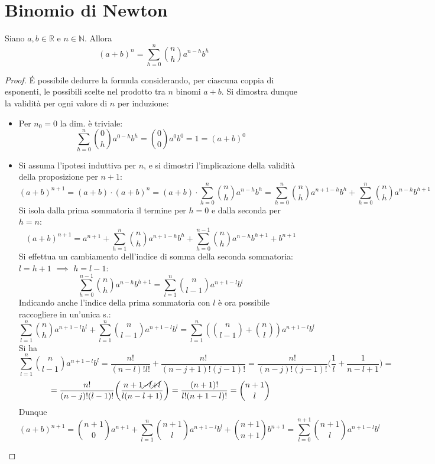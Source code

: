\documentclass[10pt, oneside]{book}
\theoremstyle{plain}
\begin{document}
\section{Binomio di Newton}
\begin{prop}
    Siano $a, b \in \mathbb{R}$ e $n \in \mathbb{N}$. Allora 
    \[(a+b)^n = \sum \limits_{h = 0}^n \binom{n}{h} a^{n - h} b^h\]
\end{prop}
\begin{proof}
    \'E possibile dedurre la formula considerando, per ciascuna coppia di esponenti, le possibili scelte nel prodotto tra $n$ binomi $a+b$. Si dimostra dunque la validità per ogni valore di $n$ per induzione:
    \begin{itemize}
        \item Per $n_0 = 0$ la dim. è triviale: 
        \[\sum \limits_{h = 0}^n \binom{0}{h} a^{0 - h} b^h = \binom{0}{0} a^0 b^0 = 1 = (a+b)^0\]
        \item Si assuma l'ipotesi induttiva per $n$, e si dimostri l'implicazione della validità della proposizione per $n+1$:
        \[(a+b)^{n+1} = (a+b) \cdot (a+b)^n = (a+b) \cdot \sum \limits_{h = 0}^n \binom{n}{h} a^{n - h} b^h = \sum \limits_{h = 0}^n \binom{n}{h} a^{n + 1 - h} b^h + \sum \limits_{h = 0}^n \binom{n}{h} a^{n - h} b^{h + 1}\]
        Si isola dalla prima sommatoria il termine per $h = 0$ e dalla seconda per $h = n$:
        \[(a+b)^{n+1} = a^{n+1} + \sum \limits_{h = 1}^n \binom{n}{h} a^{n + 1 - h} b^h + \sum \limits_{h = 0}^{n-1} \binom{n}{h} a^{n - h} b^{h +1} + b^{n+1}\]
        Si effettua un cambiamento dell'indice di somma della seconda sommatoria: $l = h+1$ $\implies$ $h = l-1$:
        \[\sum \limits_{h = 0}^{n-1} \binom{n}{h} a^{n - h} b^{h +1} = \sum \limits_{l = 1}^{n} \binom{n}{l -1} a^{n + 1 - l} b^{l}\]
        Indicando anche l'indice della prima sommatoria con $l$ è ora possibile raccogliere in un'unica s.:
        \[\sum \limits_{l = 1}^n \binom{n}{h} a^{n + 1 - l} b^l +  \sum \limits_{l = 1}^{n} \binom{n}{l -1} a^{n + 1 - l} b^{l} =  \sum \limits_{l = 1}^{n} (\binom{n}{l -1} + \binom{n}{l}) a^{n + 1 - l} b^{l}\]
        Si ha
        \[ \sum \limits_{l = 1}^{n} \binom{n}{l -1} a^{n + 1 - l} b^{l} = \frac{n!}{(n-l)! l!} + \frac{n!}{(n-j+1)! (j-1)!} = \frac{n!}{(n-j)! (j-1)!} \bigg( \frac{1}{l} + \frac{1}{n-l+1}\bigg) = \]
    \[= \frac{n!}{(n-j)! (l-1)!} \bigg( \frac{n+1 \cancel{-l} \cancel{+l}}{l (n-l+1)} \bigg) = \frac{(n+1)!}{l! (n+1-l)!} = \binom{n+1}{l}\]
    Dunque
    \[(a+b)^{n+1} = \binom{n+1}{0} a^{n+1} + \sum \limits_{l = 1}^n \binom{n+1}{l} a^{n + 1 - l} b^l + \binom{n+1}{n+1} b^{n+1} = \sum \limits_{l = 0}^{n+1} \binom{n+1}{l} a^{n + 1 - l} b^l\]
    \end{itemize}
\end{proof}
\end{document}
